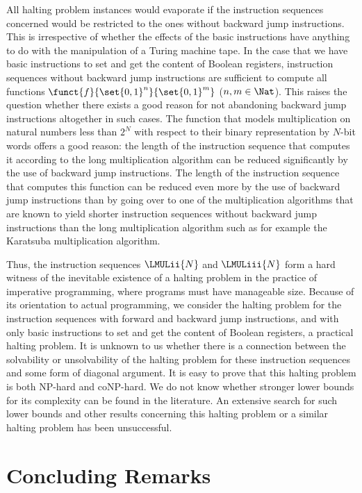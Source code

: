 \documentclass{llncs}
\begin{document}
All halting problem instances would evaporate if the instruction 
sequences concerned would be restricted to the ones without backward 
jump instructions.
This is irrespective of whether the effects of the basic instructions 
have anything to do with the manipulation of a Turing machine tape.
In the case that we have basic instructions to set and get the content 
of Boolean registers, instruction sequences without backward jump 
instructions are sufficient to compute all functions 
$\funct{f}{\set{0,1}^n}{\set{0,1}^m}$ ($n,m \in \Nat$).
This raises the question whether there exists a good reason for not 
abandoning backward jump instructions altogether in such cases.
The function that models multiplication on natural numbers less than 
$2^N$ with respect to their binary representation by $N$-bit words 
offers a good reason: the length of the instruction sequence that 
computes it according to the long multiplication algorithm can be 
reduced significantly by the use of backward jump instructions.
The length of the instruction sequence that computes this function can 
be reduced even more by the use of backward jump instructions than by 
going over to one of the multiplication algorithms that are known to 
yield shorter instruction sequences without backward jump instructions 
than the long multiplication algorithm such as for example the Karatsuba 
multiplication algorithm.

Thus, the instruction sequences $\LMULii{N}$ and $\LMULiii{N}$ form a 
hard witness of the inevitable existence of a halting problem in the 
practice of imperative programming, where programs must have manageable 
size.
Because of its orientation to actual programming, we consider the 
halting problem for the instruction sequences with forward and backward 
jump instructions, and with only basic instructions to set and get the 
content of Boolean registers, a practical halting problem.
It is unknown to us whether there is a connection between the 
solvability or unsolvability of the halting problem for these 
instruction sequences and some form of diagonal argument.
It is easy to prove that this halting problem is both NP-hard and 
coNP-hard.
We do not know whether stronger lower bounds for its complexity can be 
found in the literature.
An extensive search for such lower bounds and other results concerning 
this halting problem or a similar halting problem has been unsuccessful.

\section{Concluding Remarks}
\label{sect-concl}
\end{document}

